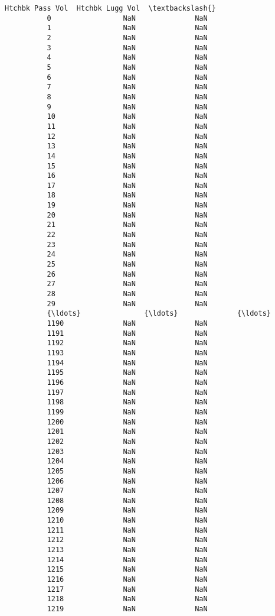\documentclass[11pt]{article}
\begin{document}
\begin{Verbatim}[commandchars=\\\{\}]
                Htchbk Pass Vol  Htchbk Lugg Vol  \textbackslash{}
          0                 NaN              NaN   
          1                 NaN              NaN   
          2                 NaN              NaN   
          3                 NaN              NaN   
          4                 NaN              NaN   
          5                 NaN              NaN   
          6                 NaN              NaN   
          7                 NaN              NaN   
          8                 NaN              NaN   
          9                 NaN              NaN   
          10                NaN              NaN   
          11                NaN              NaN   
          12                NaN              NaN   
          13                NaN              NaN   
          14                NaN              NaN   
          15                NaN              NaN   
          16                NaN              NaN   
          17                NaN              NaN   
          18                NaN              NaN   
          19                NaN              NaN   
          20                NaN              NaN   
          21                NaN              NaN   
          22                NaN              NaN   
          23                NaN              NaN   
          24                NaN              NaN   
          25                NaN              NaN   
          26                NaN              NaN   
          27                NaN              NaN   
          28                NaN              NaN   
          29                NaN              NaN   
          {\ldots}               {\ldots}              {\ldots}   
          1190              NaN              NaN   
          1191              NaN              NaN   
          1192              NaN              NaN   
          1193              NaN              NaN   
          1194              NaN              NaN   
          1195              NaN              NaN   
          1196              NaN              NaN   
          1197              NaN              NaN   
          1198              NaN              NaN   
          1199              NaN              NaN   
          1200              NaN              NaN   
          1201              NaN              NaN   
          1202              NaN              NaN   
          1203              NaN              NaN   
          1204              NaN              NaN   
          1205              NaN              NaN   
          1206              NaN              NaN   
          1207              NaN              NaN   
          1208              NaN              NaN   
          1209              NaN              NaN   
          1210              NaN              NaN   
          1211              NaN              NaN   
          1212              NaN              NaN   
          1213              NaN              NaN   
          1214              NaN              NaN   
          1215              NaN              NaN   
          1216              NaN              NaN   
          1217              NaN              NaN   
          1218              NaN              NaN   
          1219              NaN              NaN   
          

\end{Verbatim}
\end{document}
